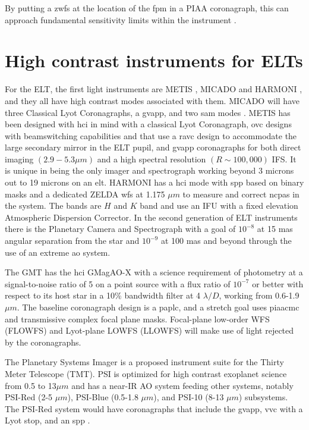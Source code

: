 \documentclass[letterpaper]{ar-1col}
\newcommand{\ld}{$\lambda/D$}
\begin{document}
By putting a \ac{zwfs} at the location of the \ac{fpm} in a PIAA coronagraph, this can approach fundamental sensitivity limits within the instrument \citep{Haffert23}.

\section{High contrast instruments for ELTs}

For the ELT, the first light instruments are METIS \citep{Brandl22}, MICADO \citep{Sturm24} and HARMONI \citep{Thatte22}, and they all have high contrast modes associated with them.
%
MICADO will have three Classical Lyot Coronagraphs, a \ac{gvapp}, and two \ac{sam} modes \citep{Huby24}. 
%
METIS has been designed with \ac{hci} in mind \citep{Kenworthy16,Absil24} with a classical Lyot Coronagraph, \ac{ovc} designs with beamswitching capabilities and that use a \ac{ravc} design to accommodate the large secondary mirror in the ELT pupil, and \ac{gvapp} coronagraphs for both direct imaging $(2.9-5.3\mu m)$ and a high spectral resolution $(R\sim 100,000)$ IFS.
%
It is unique in being the only imager and spectrograph working beyond 3 microns out to 19 microns on an \ac{elt}.
%
HARMONI has a \ac{hci} mode \citep{Houlle21} with \ac{spp} based on binary masks \citep{Carlotti23} and a dedicated ZELDA \ac{wfs} at 1.175 $\mu m$ to measure and correct \acp{ncpa} in the system.
%
The bands are $H$ and $K$ band and use an IFU with a fixed elevation Atmospheric Dispersion Corrector.
%
In the second generation of ELT instruments there is the Planetary Camera and Spectrograph \citep[PCS; ][]{Kasper21} with a goal of $10^{-8}$ at 15 mas angular separation from the star and $10^{-9}$ at 100 mas and beyond through the use of an extreme \ac{ao} system. 

The GMT	has the \ac{hci} GMagAO-X \citep{Males24} with a science requirement of photometry at a signal-to-noise ratio of 5 on a point source with a flux ratio of $10^{-7}$ or better with respect to its host star in a 10\% bandwidth filter at 4 \ld{}, working from 0.6-1.9 $\mu m$.
%
The baseline coronagraph design is a \ac{paplc}, and a stretch goal uses \ac{piaacmc} and transmissive complex focal plane masks.
%
Focal-plane low-order WFS (FLOWFS) and Lyot-plane LOWFS (LLOWFS) will make use of light rejected by the coronagraphs.

The Planetary Systems Imager \citep[PSI; ][]{Fitzgerald22} is a proposed instrument suite for the Thirty Meter Telescope (TMT).
%
PSI is optimized for high contrast exoplanet science from 0.5 to 13$\mu m$ and has a near-IR AO system feeding other systems, notably PSI-Red (2-5 $\mu m$), PSI-Blue (0.5-1.8 $\mu m$), and PSI-10 (8-13 $\mu m$) subsystems. 
%
The PSI-Red system would have coronagraphs that include the \ac{gvapp}, \ac{vvc} with a Lyot stop, and an \ac{spp} \citep{Jensen-Clem21}.
\end{document}
